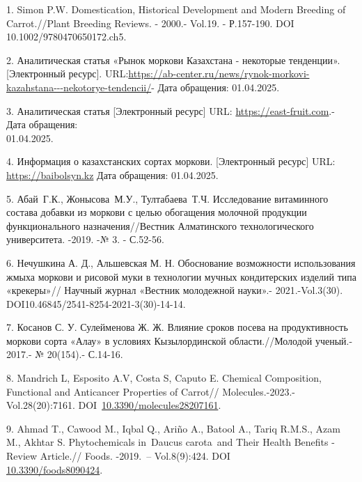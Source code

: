 \begin{refs}
1. Simon P.W. Domestication, Historical Development and Modern Breeding
of Carrot.//Plant Breeding Reviews. - 2000.- Vol.19. - Р.157-190. DOI
10.1002/9780470650172.ch5.

2. Аналитическая статья «Рынок моркови Казахстана - некоторые
тенденции». {[}Электронный ресурс{]}.
URL:\href{https://ab-centre.ru/news/rynok-morkovi-kazahstana---nekotorye-tendencii/}{https://ab-center.ru/news/rynok-morkovi-kazahstana-\/-\/-nekotorye-tendencii/}-
Дата обращения: 01.04.2025.

3. Аналитическая статья {[}Электронный ресурс{]} URL:
\href{https://east-fruit.com/novosti/na-nachalo-yanvarya-2022-goda-zapasy-morkovi-v-kazakhstane-prevyshali-200-tys-tonn/}{https://east-fruit.com}.-
Дата обращения: \\01.04.2025.

4. Информация о казахстанских сортах моркови. {[}Электронный ресурс{]}
URL:
\href{https://baibolsyn.kz/ru/semena/?search=\%D0\%BC\%D0\%BE\%D1\%80\%D0\%BA\%D0\%BE\%D0\%B2\%D1\%8C&page=1/}{https://baibolsyn.kz}
Дата обращения: 01.04.2025.

5. Абай~Г.К., Жонысова~М.У., Тултабаева~Т.Ч. Исследование витаминного
состава добавки из моркови с целью обогащения молочной продукции
функционального назначения//Вестник Алматинского технологического
университета. -2019. -№ 3. - С.52-56.

6. Нечушкина А. Д., Альшевская М. Н. Обоснование возможности
использования жмыха моркови и рисовой муки в технологии мучных
кондитерских изделий типа «крекеры»// Научный журнал «Вестник молодежной
науки».- 2021.-Vol.3(30). DOI10.46845/2541-8254-2021-3(30)-14-14.

7. Косанов С. У. Сулейменова Ж. Ж. Влияние сроков посева на
продуктивность моркови сорта «Алау» в условиях Кызылординской
области.//Молодой ученый.- 2017.- № 20(154).- С.14-16.

8. Mandrich L, Esposito A.V, Costa S, Caputo E. Chemical Composition,
Functional and Anticancer Properties of Carrot// Molecules.-2023.-
Vol.28(20):7161.
DOI~\href{https://doi.org/10.3390/molecules28207161}{10.3390/molecules28207161}.

9. Ahmad T., Cawood M., Iqbal Q., Ariño A., Batool A., Tariq R.M.S.,
Azam M., Akhtar S. Phytochemicals in~Daucus carota~and Their Health
Benefits -Review Article.// Foods. -2019.~-- Vol.8(9):424. DOI\\
\href{https://doi.org/10.3390/foods8090424}{10.3390/foods8090424}.


\end{refs}
